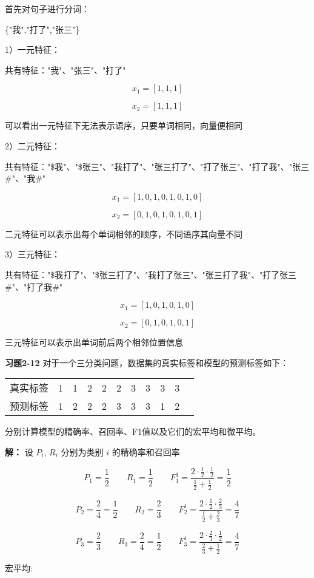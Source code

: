 首先对句子进行分词：

\{"我","打了","张三"\}

1）一元特征：

共有特征："我"、"张三"、"打了"

\[
x_1 = [1,1,1]
\]

\[
x_2 = [1,1,1]
\]

可以看出一元特征下无法表示语序，只要单词相同，向量便相同

2）二元特征：

共有特征："\$我"、"\$张三"、"我打了"、"张三打了"、"打了张三"、"打了我"、"张三\#"、"我\#"

\[
x_1 = [1,0,1,0,1,0,1,0]
\]

\[
x_2 = [0,1,0,1,0,1,0,1]
\]

二元特征可以表示出每个单词相邻的顺序，不同语序其向量不同

3）三元特征：

共有特征："\$我打了"、"\$张三打了"、"我打了张三"、"张三打了我"、"打了张三\#"、"打了我\#"

\[
x_1 = [1,0,1,0,1,0]
\]

\[
x_2 = [0,1,0,1,0,1]
\]

三元特征可以表示出单词前后两个相邻位置信息

\noindent\textbf{习题2-12} 对于一个三分类问题，数据集的真实标签和模型的预测标签如下：

\begin{tabular}{ccccccccccc}
\hline
真实标签 & 1 & 1 & 2 & 2 & 2 & 3 & 3 & 3 & 3 \\
预测标签 & 1 & 2 & 2 & 2 & 3 & 3 & 3 & 1 & 2 \\
\hline
\end{tabular}

分别计算模型的精确率、召回率、F1值以及它们的宏平均和微平均。

\textbf{解：} 设 $P_i$, $R_i$ 分别为类别 $i$ 的精确率和召回率

\[P_1 = \frac{1}{2} \qquad R_1 = \frac{1}{2} \qquad F_1^1 = \frac{2\cdot\frac{1}{2}\cdot\frac{1}{2}}{\frac{1}{2}+\frac{1}{2}} = \frac{1}{2}\]

\[P_2 = \frac{2}{4} = \frac{1}{2} \qquad R_2 = \frac{2}{3} \qquad F_2^1 = \frac{2\cdot\frac{1}{2}\cdot\frac{2}{3}}{\frac{1}{2}+\frac{2}{3}} = \frac{4}{7}\]

\[P_3 = \frac{2}{3} \qquad R_3 = \frac{2}{4} = \frac{1}{2} \qquad F_3^1 = \frac{2\cdot\frac{2}{3}\cdot\frac{1}{2}}{\frac{2}{3}+\frac{1}{2}} = \frac{4}{7}\]

宏平均:


